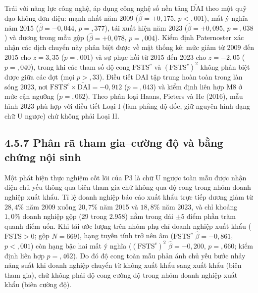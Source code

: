 \documentclass[
  a4paper,
  13pt]{extreport}
\begin{document}
Trái với năng lực công nghệ, áp dụng công nghệ số nền tảng
\(\tilde{\mathrm{DAI}}\) theo một quỹ đạo không đơn điệu: mạnh nhất năm
2009 (\(\hat{\beta} = +0{,}175\), \(p < {,}001\)), mất ý nghĩa năm 2015
(\(\hat{\beta} = -0{,}044\), \(p = {,}377\)), tái xuất hiện năm 2023
(\(\hat{\beta} = +0{,}095\), \(p = {,}038\)) và dương trong mẫu gộp
(\(\hat{\beta} = +0{,}078\), \(p = {,}004\)). Kiểm định Paternoster xác
nhận các dịch chuyển này phân biệt được về mặt thống kê: mức giảm từ
2009 đến 2015 cho \(z = 3{,}35\) (\(p = {,}001\)) và sự phục hồi từ 2015
đến 2023 cho \(z = -2{,}05\) (\(p = {,}040\)), trong khi các tham số độ
cong \(\mathrm{FSTS}^{c}\) và \((\mathrm{FSTS}^{c})^2\) không phân biệt
được giữa các đợt (mọi \(p > {,}33\)). Điều tiết DAI tập trung hoàn toàn
trong làn sóng 2023, nơi
\(\mathrm{FSTS}^{c} \times \tilde{\mathrm{DAI}} = -0{,}912\)
(\(p = {,}043\)) và kiểm định liên hợp M8 ở mức cận ngưỡng
(\(p = {,}062\)). Theo phân loại Haans, Pieters và He (2016), mẫu hình
2023 phù hợp với điều tiết Loại I (làm phẳng độ dốc, giữ nguyên hình
dạng chữ U ngược) chứ không phải Loại II.

\hypertarget{phuxe2n-ruxe3-tham-giacux1b0ux1eddng-ux111ux1ed9-vuxe0-bux1eb1ng-chux1ee9ng-nux1ed9i-sinh}{%
\subsection{4.5.7 Phân rã tham gia--cường độ và bằng chứng nội
sinh}\label{phuxe2n-ruxe3-tham-giacux1b0ux1eddng-ux111ux1ed9-vuxe0-bux1eb1ng-chux1ee9ng-nux1ed9i-sinh}}

Một phát hiện thực nghiệm cốt lõi của P3 là chữ U ngược toàn mẫu được
nhận diện chủ yếu thông qua biên tham gia chứ không qua độ cong trong
nhóm doanh nghiệp xuất khẩu. Tỉ lệ doanh nghiệp báo cáo xuất khẩu trực
tiếp dương giảm từ \(28{,}4\%\) năm 2009 xuống \(20{,}7\%\) năm 2015 và
\(18{,}8\%\) năm 2023, và chỉ khoảng \(1{,}0\%\) doanh nghiệp gộp (29
trong 2.958) nằm trong dải \(\pm 5\) điểm phần trăm quanh điểm uốn. Khi
tái ước lượng trên nhóm phụ chỉ doanh nghiệp xuất khẩu
(\(\mathrm{FSTS} > 0\); gộp \(N = 669\)), hạng tuyến tính trở nên âm
(\(\mathrm{FSTS}^{c}\) \(\hat{\beta} = -0{,}861\), \(p < {,}001\)) còn
hạng bậc hai mất ý nghĩa (\((\mathrm{FSTS}^{c})^2\)
\(\hat{\beta} = -0{,}200\), \(p = {,}660\); kiểm định liên hợp
\(p = {,}462\)). Do đó độ cong toàn mẫu phản ánh chủ yếu bước nhảy năng
suất khi doanh nghiệp chuyển từ không xuất khẩu sang xuất khẩu (biên
tham gia), chứ không phải độ cong cường độ trong nhóm doanh nghiệp xuất
khẩu (biên cường độ).
\end{document}
